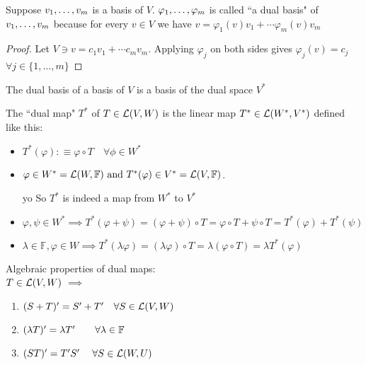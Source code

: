 \setcounter{thm}{113}
\begin{thm}
  Suppose $v_1, \dots, v_m$ is a basis of $V$. $\varphi_1, \dots, \varphi_m$ is called ``a dual basis" of $v_1, \dots, v_m$ because for every $v \in V$ we have $v=\varphi_1 (v)v_1 + \cdots \varphi_m(v)v_m$
\end{thm}
\begin{proof}
  Let $V \ni v= c_1v_1 + \cdots c_mv_m$. Applying
  $\varphi_j$ on both sides gives $\varphi_j(v)=c_j$ $\forall j\in \{1, \dots, m\}$
\end{proof}

\setcounter{thm}{115}
\begin{thm}
  The dual basis of a basis of $V$ is a basis of the dual space $V^{*}$
\end{thm}

\setcounter{thm}{117}
\begin{mydef}

  The ``dual map" $T^{*}$ of $T \in \mathcal{L}(V,W)$ is the linear map $T^{*} \in {\mathcal{L}(W^{*}, V^{*})}$ defined like this:

  \begin{itemize}
    \item[] $T^{*}(\varphi) :\equiv \varphi \circ T \quad \forall \phi \in W^{*}$
    \item $\varphi \in W^{*}={\mathcal{L}(W, \mathbb{F})} \text{ and } T^{*}(\varphi) \in V^{*} = {\mathcal{L}(V, \mathbb{F})}$.

    yo
    So $T^{*}$ is indeed a map from $W^{*}$ to $V^{*}$


    \item $\varphi, \psi \in W^{*} \implies T^{*} (\varphi + \psi) = (\varphi + \psi) \circ T = \varphi \circ T + \psi \circ T = T^{*} (\varphi) + T^{*} (\psi)$
    \item $\lambda \in \mathbb{F}, \varphi \in W \implies T^{*} (\lambda \varphi) = (\lambda \varphi) \circ T = \lambda (\varphi \circ T) = \lambda T^{*} (\varphi)$
  \end{itemize}

\end{mydef}

\setcounter{thm}{119}
\begin{thm}
  \label{algebraic-properties-of-dual-maps}
  Algebraic properties of dual maps:  \\
  $T \in \mathcal{L}(V,W)$ $\implies$
  \begin{enumerate}
    \item $(S+T)' = S' + T' \quad \forall S \in \mathcal{L}(V,W)$
    \item $(\lambda T)' = \lambda T' \quad \quad \forall \lambda \in \mathbb{F}$
    \item $(ST)' = T'S' \quad \; \forall S \in \mathcal{L} (W,U)$
  \end{enumerate}
\end{thm}

